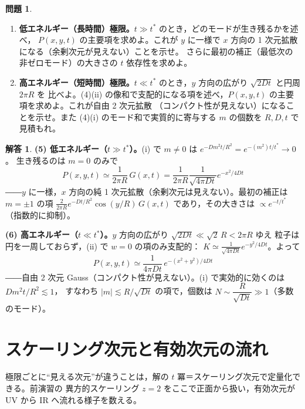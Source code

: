 \documentclass[dvipdfmx, uplatex]{jsarticle}
\theoremstyle{definition}
\newtheorem*{prob}{問題}
\newtheorem*{sol}{解答}
\begin{document}
\begin{prob}
\begin{enumerate}[start=5]
\item \textbf{低エネルギー（長時間）極限。}$t\gg t^\ast$ のとき，どのモードが生き残るかを述べ，
$P(x,y,t)$ の主要項を求めよ。これが $y$ に一様で $x$ 方向の 1 次元拡散になる（余剰次元が見えない）ことを示せ。
さらに最初の補正（最低次の非ゼロモード）の大きさの $t$ 依存性を求めよ。
\item \textbf{高エネルギー（短時間）極限。}$t\ll t^\ast$ のとき，$y$ 方向の広がり $\sqrt{2Dt}$ と円周 $2\pi R$ を
比べよ。(4)(ii) の像和で支配的になる項を述べ，$P(x,y,t)$ の主要項を求めよ。これが自由 2 次元拡散
（コンパクト性が見えない）になることを示せ。また (4)(i) のモード和で実質的に寄与する $m$ の個数を
$R,D,t$ で見積もれ。
\end{enumerate}
\end{prob}

\begin{sol}
\textbf{(5) 低エネルギー（$t\gg t^\ast$）。}(i) で $m\neq0$ は $e^{-Dm^2t/R^2}=e^{-(m^2)t/t^\ast}\to0$。
生き残るのは $\boxed{m=0}$ のみで
\[
    \boxed{\,P(x,y,t)\simeq\frac{1}{2\pi R}\,G(x,t)=\frac{1}{2\pi R}\frac{1}{\sqrt{4\pi Dt}}e^{-x^2/4Dt}\,}
\]
――$y$ に一様，$x$ 方向の純 1 次元拡散（余剰次元は見えない）。最初の補正は $m=\pm1$ の項
$\frac{2}{2\pi R}e^{-Dt/R^2}\cos(y/R)\,G(x,t)$ であり，その大きさは $\boxed{\propto e^{-t/t^\ast}}$
（指数的に抑制）。

\par\smallskip
\textbf{(6) 高エネルギー（$t\ll t^\ast$）。}$y$ 方向の広がり $\sqrt{2Dt}\ll\sqrt{2}\,R<2\pi R$ ゆえ
粒子は円を一周しておらず，(ii) で $\boxed{w=0}$ の項のみ支配的：
$K\simeq\frac{1}{\sqrt{4\pi Dt}}e^{-y^2/4Dt}$。よって
\[
    \boxed{\,P(x,y,t)\simeq\frac{1}{4\pi Dt}\,e^{-(x^2+y^2)/4Dt}\,}
\]
――自由 2 次元 Gauss（コンパクト性が見えない）。(i) で実効的に効くのは $Dm^2t/R^2\lesssim1$，
すなわち $|m|\lesssim R/\sqrt{Dt}$ の項で，個数は $\boxed{N\sim\dfrac{R}{\sqrt{Dt}}\gg1}$（多数のモード）。
\end{sol}

\section{スケーリング次元と有効次元の流れ}
極限ごとに``見える次元''が違うことは，解の $t$ 冪＝スケーリング次元で定量化できる。前演習の
異方的スケーリング $z=2$ をここで正面から扱い，有効次元が UV から IR へ流れる様子を数える。
\end{document}
